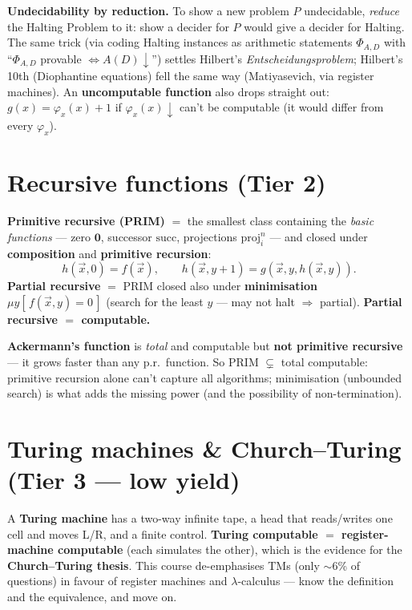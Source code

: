 \documentclass[11pt,a4paper]{article}
\begin{document}
\begin{useful}
\textbf{Undecidability by reduction.} To show a new problem $P$ undecidable, \emph{reduce} the Halting Problem to it: show a decider for $P$ would give a decider for Halting. The same trick (via coding Halting instances as arithmetic statements $\Phi_{A,D}$ with ``$\Phi_{A,D}$ provable $\iff A(D){\downarrow}$'') settles Hilbert's \emph{Entscheidungsproblem}; Hilbert's 10th (Diophantine equations) fell the same way (Matiyasevich, via register machines). An \textbf{uncomputable function} also drops straight out: $g(x)=\varphi_x(x)+1$ if $\varphi_x(x){\downarrow}$ can't be computable (it would differ from every $\varphi_x$).
\end{useful}

\section{Recursive functions (Tier 2)}

\begin{must}
\textbf{Primitive recursive (PRIM)} $=$ the smallest class containing the \emph{basic functions} --- zero $\mathbf 0$, successor $\mathrm{succ}$, projections $\mathrm{proj}^n_i$ --- and closed under
\textbf{composition} and \textbf{primitive recursion}:
\[
h(\vec x,0)=f(\vec x),\qquad h(\vec x,y{+}1)=g(\vec x,y,h(\vec x,y)).
\]
\textbf{Partial recursive} $=$ PRIM closed also under \textbf{minimisation} $\mu y[\,f(\vec x,y)=0\,]$ (search for the least $y$ --- may not halt $\Rightarrow$ partial). \textbf{Partial recursive $=$ computable.}
\end{must}

\begin{useful}
\textbf{Ackermann's function} is \emph{total} and computable but \textbf{not primitive recursive} --- it grows faster than any p.r.\ function. So PRIM $\subsetneq$ total computable: primitive recursion alone can't capture all algorithms; minimisation (unbounded search) is what adds the missing power (and the possibility of non-termination).
\end{useful}

\section{Turing machines \& Church--Turing (Tier 3 --- low yield)}

\begin{useful}
A \textbf{Turing machine} has a two-way infinite tape, a head that reads/writes one cell and moves L/R, and a finite control. \textbf{Turing computable $=$ register-machine computable} (each simulates the other), which is the evidence for the \textbf{Church--Turing thesis}. This course de-emphasises TMs (only $\sim$6\% of questions) in favour of register machines and $\lambda$-calculus --- know the definition and the equivalence, and move on.
\end{useful}
\end{document}
